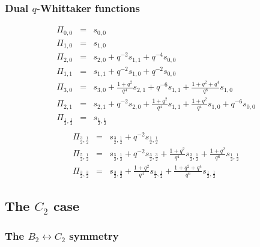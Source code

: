 \documentclass[12pt]{amsart}
\numberwithin{equation}{section}
\numberwithin{table}{section}
\begin{document}
\begin{appendix}
\subsubsection{Dual $q$-Whittaker functions}

\begin{eqnarray*}
\Pi_{0,0}&=& s_{0,0}\\
\Pi_{1,0}&=& s_{1,0} \\
\Pi_{2,0}&=& s_{2,0}+q^{-2}s_{1,1}+q^{-4}s_{0,0} \\
\Pi_{1,1}&=& s_{1,1}+q^{-2}s_{1,0}+q^{-2}s_{0,0} \\
\Pi_{3,0}&=& s_{3,0}+\frac{1+q^2}{q^4} s_{2,1}+q^{-6}s_{1,1}+\frac{1+q^2+q^4}{q^8}s_{1,0}\\
\Pi_{2,1}&=& s_{2,1}+q^{-2}s_{2,0}+\frac{1+q^2}{q^4} s_{1,1}+\frac{1+q^2}{q^4} s_{1,0}+q^{-6}s_{0,0} \\
\Pi_{\frac{1}{2},\frac{1}{2}}&=& s_{\frac{1}{2},\frac{1}{2}}\\
\end{eqnarray*}
\begin{eqnarray*}
\Pi_{\frac{3}{2},\frac{1}{2}}&=& s_{\frac{3}{2},\frac{1}{2}}+q^{-2}s_{\frac{1}{2},\frac{1}{2}}\\
\Pi_{\frac{5}{2},\frac{1}{2}}&=& s_{\frac{5}{2},\frac{1}{2}}+q^{-2}s_{\frac{3}{2},\frac{3}{2}}+\frac{1+q^2}{q^4} s_{\frac{3}{2},\frac{1}{2}}+
\frac{1+q^2}{q^6}s_{\frac{1}{2},\frac{1}{2}}\\
\Pi_{\frac{3}{2},\frac{3}{2}}&=& s_{\frac{3}{2},\frac{3}{2}}+\frac{1+q^2}{q^4} s_{\frac{3}{2},\frac{1}{2}}+
\frac{1+q^2+q^4}{q^6}s_{\frac{1}{2},\frac{1}{2}}
\end{eqnarray*}

\subsection{The $C_2$ case}

\subsubsection{The $B_2\leftrightarrow C_2$ symmetry}


\end{appendix}
\end{document}
